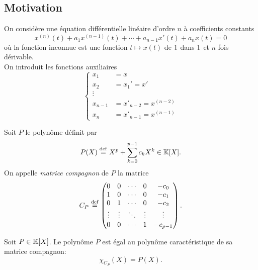 \subsection{Motivation}

On considère une équation différentielle linéaire d'ordre $n$ à coefficients constants
\[
x^{(n)}(t) + a_1 x^{(n-1)}(t) + \cdots + a_{n-1} x'(t) + a_n x(t) = 0
\]
où la fonction inconnue est une fonction $t \mapsto x(t)$ de $1$ dans $1$ et $n$ fois dérivable. \\
On introduit les fonctions auxiliaires
\[
\begin{cases}
    x_1 &= x \\
    x_2 &= x_1' = x' \\
    \vdots \\
    x_{n-1} &= x'_{n-2} = x^{(n-2)} \\
    x_n &= x'_{n-1} = x^{(n-1)}
\end{cases}
\]

\begin{defi}
    Soit $P$ le polynôme définit par 
    $$P(X) \overset{\mathrm{\tiny def}}{=} X^p + \sum\limits_{k=0}^{p-1} c_k X^k \in \mathbb{K}[X].$$
    On appelle \emph{matrice compagnon} de $P$ la matrice
\[
C_P \overset{\mathrm{\tiny def}}{=}
\begin{pmatrix}
0 & 0 & \cdots & 0 & -c_0\\
1 & 0 & \cdots & 0 & -c_1\\
0 & 1 & \cdots & 0 & -c_2\\
\vdots & \vdots & \ddots & \vdots & \vdots\\
0 & 0 & \cdots & 1 & -c_{p-1}
\end{pmatrix}.
\]
\end{defi}

\begin{theo} 
    Soit $P \in \mathbb{K}[X]$. Le polynôme $P$ est égal au polynôme caractéristique de sa matrice compagnon:
    $$\chi_{C_P}(X) = P(X).$$
\end{theo}   

